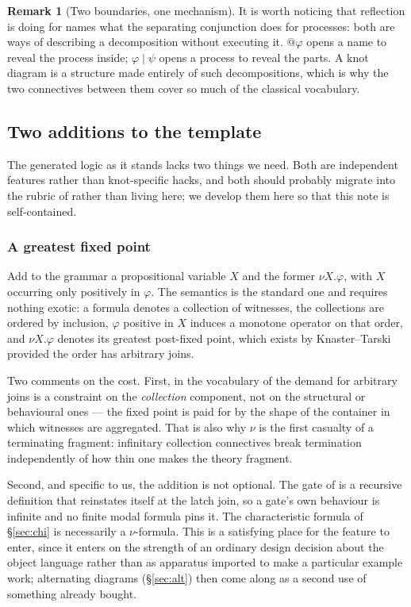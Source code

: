 \documentclass[11pt]{article}
\theoremstyle{definition}
\newtheorem{remark}{Remark}
\newcommand{\sep}{\mathbin{\vert}}
\begin{document}
\begin{remark}[Two boundaries, one mechanism]
It is worth noticing that reflection is doing for names what the separating
conjunction does for processes: both are ways of describing a decomposition
without executing it. $@\varphi$ opens a name to reveal the process inside;
$\varphi \sep \psi$ opens a process to reveal the parts. A knot diagram is a
structure made entirely of such decompositions, which is why the two connectives
between them cover so much of the classical vocabulary.
\end{remark}

\subsection{Two additions to the template}\label{sec:additions}

The generated logic as it stands lacks two things we need. Both are independent
features rather than knot-specific hacks, and both should probably migrate into
the rubric of \cite{omnibus} rather than living here; we develop them here so that
this note is self-contained.

\subsubsection{A greatest fixed point}\label{sec:nu}

Add to the grammar a propositional variable $X$ and the former $\nu X.\varphi$,
with $X$ occurring only positively in $\varphi$. The semantics is the standard
one and requires nothing exotic: a formula denotes a collection of witnesses, the
collections are ordered by inclusion, $\varphi$ positive in $X$ induces a monotone
operator on that order, and $\nu X.\varphi$ denotes its greatest post-fixed point,
which exists by Knaster--Tarski provided the order has arbitrary joins.

Two comments on the cost. First, in the vocabulary of \cite{splitting} the demand
for arbitrary joins is a constraint on the \emph{collection} component, not on
the structural or behavioural ones --- the fixed point is paid for by the shape of
the container in which witnesses are aggregated. That is also why $\nu$ is the
first casualty of a terminating fragment: infinitary collection connectives break
termination independently of how thin one makes the theory fragment.

Second, and specific to us, the addition is not optional. The gate of \cite{knots}
is a recursive definition that reinstates itself at the latch join, so a gate's
own behaviour is infinite and no finite modal formula pins it. The characteristic
formula of \S\ref{sec:chi} is necessarily a $\nu$-formula. This is a satisfying
place for the feature to enter, since it enters on the strength of an ordinary
design decision about the object language rather than as apparatus imported to
make a particular example work; alternating diagrams (\S\ref{sec:alt}) then come
along as a second use of something already bought.
\end{document}
